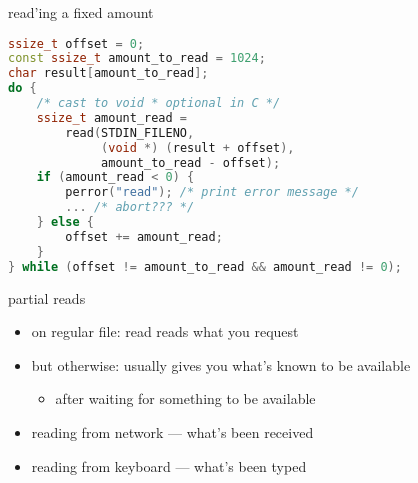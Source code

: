 
\begin{frame}[fragile,label=readExample2]{read'ing a fixed amount}
\begin{lstlisting}[language=C++,style=small,morekeywords=ssize\_t]
ssize_t offset = 0;
const ssize_t amount_to_read = 1024;
char result[amount_to_read];
do {
    /* cast to void * optional in C */
    ssize_t amount_read = 
        read(STDIN_FILENO,
             (void *) (result + offset),
             amount_to_read - offset);
    if (amount_read < 0) {
        perror("read"); /* print error message */
        ... /* abort??? */
    } else {
        offset += amount_read;
    }
} while (offset != amount_to_read && amount_read != 0);
\end{lstlisting}
\end{frame}

\begin{frame}{partial reads}
\begin{itemize}
    \item on regular file: read reads what you request
    \item but otherwise: usually gives you what's known to be available
        \begin{itemize}
            \item after waiting for something to be available
        \end{itemize}
    \vspace{.5cm}
    \item<2-> reading from network --- what's been received
    \item<2-> reading from keyboard --- what's been typed
\end{itemize}
\end{frame}
